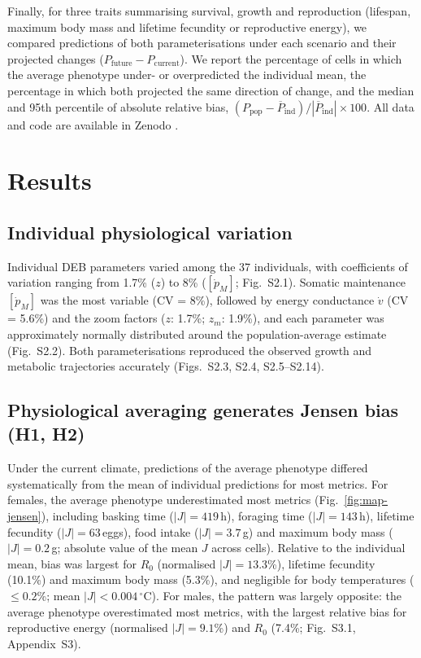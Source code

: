 \documentclass[12pt]{article}
\begin{document}
Finally, for three traits summarising survival, growth and reproduction (lifespan, maximum body mass and lifetime fecundity or reproductive energy), we compared predictions of both parameterisations under each scenario and their projected changes ($P_{\mathrm{future}} - P_{\mathrm{current}}$). We report the percentage of cells in which the average phenotype under- or overpredicted the individual mean, the percentage in which both projected the same direction of change, and the median and 95th percentile of absolute relative bias, $(P_{\mathrm{pop}} - \overline{P}_{\mathrm{ind}}) / |\overline{P}_{\mathrm{ind}}| \times 100$. All data and code are available in Zenodo \parencite{enriquez-urzelai2026data}.

\section{Results}

\subsection{Individual physiological variation}

Individual DEB parameters varied among the 37 individuals, with coefficients of variation ranging from 1.7\% ($z$) to 8\% ($[\dot{p}_M]$; Fig.~S2.1). Somatic maintenance $[\dot{p}_M]$ was the most variable (CV = 8\%), followed by energy conductance $\dot{v}$ (CV = 5.6\%) and the zoom factors ($z$: 1.7\%; $z_m$: 1.9\%), and each parameter was approximately normally distributed around the population-average estimate (Fig.~S2.2). Both parameterisations reproduced the observed growth and metabolic trajectories accurately (Figs.~S2.3, S2.4, S2.5--S2.14).

\subsection{Physiological averaging generates Jensen bias (H1, H2)}

Under the current climate, predictions of the average phenotype differed systematically from the mean of individual predictions for most metrics. For females, the average phenotype underestimated most metrics (Fig.~\ref{fig:map-jensen}), including basking time ($|J| = 419$\,h), foraging time ($|J| = 143$\,h), lifetime fecundity ($|J| = 63$\,eggs), food intake ($|J| = 3.7$\,\si{\g}) and maximum body mass ($|J| = 0.2$\,\si{\g}; absolute value of the mean $J$ across cells). Relative to the individual mean, bias was largest for $R_0$ (normalised $|J| = 13.3$\%), lifetime fecundity (10.1\%) and maximum body mass (5.3\%), and negligible for body temperatures ($\leq 0.2$\%; mean $|J| < 0.004$\,${}^{\circ}$C). For males, the pattern was largely opposite: the average phenotype overestimated most metrics, with the largest relative bias for reproductive energy (normalised $|J| = 9.1$\%) and $R_0$ (7.4\%; Fig.~S3.1, Appendix~S3).
\end{document}
